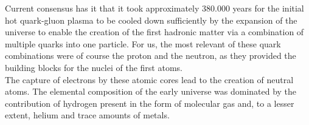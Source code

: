     Current consensus has it that it took approximately 380.000 years for
    the initial hot quark-gluon plasma to be cooled down sufficiently by 
    the expansion of the universe to enable 
    the creation of the first hadronic matter via 
    a combination of multiple quarks into one particle. 
    For us, the most relevant of these quark combinations were of course the proton and the neutron,
    as they provided the building blocks for the nuclei of the first atoms. \\

    The capture of electrons by these atomic cores lead to the creation of neutral atoms. 
    The elemental composition of the early universe was dominated by the contribution 
    of hydrogen present in the form of molecular gas and, to a lesser extent, 
    helium and trace amounts of metals. 



    







    




